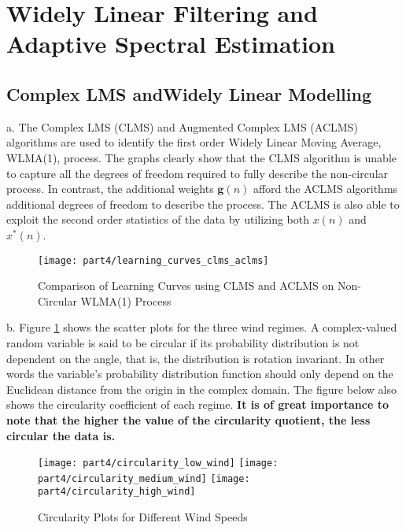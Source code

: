 \section{Widely Linear Filtering and Adaptive Spectral Estimation}

\subsection{Complex LMS andWidely Linear Modelling}
\noindent{}a. The Complex LMS (CLMS) and Augmented Complex LMS (ACLMS) algorithms are used to identify the first order Widely Linear Moving Average, WLMA(1), process. The graphs clearly show that the CLMS algorithm is unable to capture all the degrees of freedom required to fully describe the non-circular process. In contrast, the additional weights $\textbf{g}(n)$ afford the ACLMS algorithms additional degrees of freedom to describe the process. The ACLMS is also able to exploit the second order statistics of the data by utilizing both $x(n)$ and $x^*(n)$.

\begin{figure}[H]
\centering{}
\texttt{[image: part4/learning\_curves\_clms\_aclms]}
\caption{Comparison of Learning Curves using CLMS and ACLMS on Non-Circular WLMA(1) Process}
\end{figure}

\noindent{}b. Figure \ref{fig:wind_circularity} shows the scatter plots for the three wind regimes. A complex-valued random variable is said to be circular if its probability distribution is not dependent on the angle, that is, the distribution is rotation invariant. In other words the variable's probability distribution function should only depend on the Euclidean distance from the origin in the complex domain. The figure below also shows the circularity coefficient of each regime.\textbf{ It is of great importance to note that the higher the value of the circularity quotient, the less circular the data is.}

\begin{figure}[H]
\centering{}
\texttt{[image: part4/circularity\_low\_wind]}
\texttt{[image: part4/circularity\_medium\_wind]}
\texttt{[image: part4/circularity\_high\_wind]}
\caption{Circularity Plots for Different Wind Speeds}
\label{fig:wind_circularity}
\end{figure}

